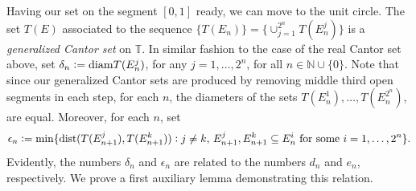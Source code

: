\documentclass[12pt]{amsart}
\theoremstyle{definition}\newtheorem{remark}[theorem]{Remark}
\theoremstyle{definition}\newtheorem{example}[theorem]{Example}
\theoremstyle{definition}\newtheorem{definition}{Definition}
\numberwithin{equation}{section}
\newcommand\TT{{\mathbb T}}
\begin{document}
Having our set on the segment $[0,1]$ ready, we can move to the unit circle. The set $T(E)$ associated to the sequence $\{T(E_n)\}=\{\cup_{j=1}^{2^n}T(E_n^j)\}$ is a \textit{generalized Cantor set} on $\TT$. In similar fashion to the case of the real Cantor set above, set $\delta_n\vcentcolon= \mathrm{diam}T(E_n^j)$, for any $j=1,\dots,2^n$, for all $n\in\mathbb{N}\cup\{0\}$. Note that since our generalized Cantor sets are produced by removing middle third open segments in each step, for each $n$, the diameters of the sets $T(E_n^1),\dots,T(E_n^{2^n})$, are equal. Moreover, for each $n$, set
\begin{equation*}
    \epsilon_n \vcentcolon= \min\{\mathrm{dist}(T(E_{n+1}^j),T(E_{n+1}^k))\vcentcolon j\ne k, \, E_{n+1}^j,E_{n+1}^k\subseteq E_n^i \text{ for some }i=1,\dots,2^n\}.
\end{equation*}
Evidently, the numbers $\delta_n$ and $\epsilon_n$ are related to the numbers $d_n$ and $e_n$, respectively. We prove a first auxiliary lemma demonstrating this relation.
\end{document}
